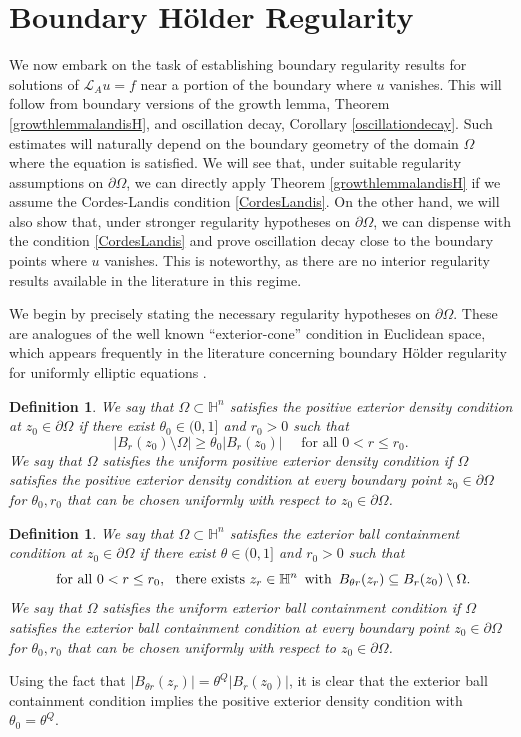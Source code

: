 \documentclass[12pt]{amsart}
\newtheorem{Definition}[Theorem]{Definition}
\newcommand{\Lop}{\mathcal{L}}
\def \H {{\mathbb H}}
\def \Hn {{\mathbb H}^n}
\def \O {\Omega}
\begin{document}
\section{Boundary H\"older Regularity}\label{sec:Holder}

We now embark on the task of establishing boundary regularity results for solutions of $\Lop_A u = f$ near a portion of the boundary where $u$ vanishes. This will follow from boundary versions of the growth lemma, Theorem \ref{growthlemmalandisH}, and oscillation decay, Corollary \ref{oscillationdecay}. Such estimates will naturally depend on the boundary geometry of the domain $\Omega$ where the equation is satisfied. We will see that, under suitable regularity assumptions on $\partial\Omega$, we can directly apply Theorem \ref{growthlemmalandisH} if we assume the Cordes-Landis condition \eqref{CordesLandis}. On the other hand, we will also show that, under stronger regularity hypotheses on $\partial\Omega$, we can dispense with the condition \eqref{CordesLandis} and prove oscillation decay close to the boundary points where $u$ vanishes. This is noteworthy, as there are no interior regularity results available in the literature in this regime.  

We begin by precisely stating the necessary regularity hypotheses on $\partial\Omega$. These are analogues of the well known ``exterior-cone'' condition in Euclidean space, which appears frequently in the literature concerning boundary H\"older regularity for uniformly elliptic equations \cite{Miller67, %
Michael81, ChoSafonov}.

\begin{Definition}
We say that $\O \subset \H^n$ satisfies the \emph{positive exterior density condition} at $z_0\in\partial\O$ if there exist $\theta_0 \in (0,1]$ and $r _0>0$ such that
$$
|B_r(z_0) \setminus \O|  \geq \theta_0 |B_r(z_0)|\quad\mbox{ for all }0<r\leq r_0.
$$
We say that $\O$ satisfies the \emph{uniform positive exterior density condition} if $\O$ satisfies the positive exterior density condition at every boundary point $z_0\in\partial\O$ for $\theta_0, r_0$ that can be chosen uniformly with respect to $z_0\in\partial\O$.
\end{Definition}

\begin{Definition}\label{contball}
We say that $\O \subset \H^n$ satisfies the \emph{exterior ball containment condition} at $z_0\in\partial\O$ if there exist $\theta\in (0,1]$ and $r_0>0$ such that
\begin{equation}\label{pointneeded}
\mbox{ for all } 0<r\leq r_0, \,\,\mbox{ there exists }z_r\in \Hn\mbox\, \mbox{ with }\, B_{\theta r}(z_r)\subseteq B_r(z_0) \setminus \O.
\end{equation}
We say that $\O$ satisfies the \emph{uniform exterior ball containment condition} if $\O$ satisfies the exterior ball containment condition at every boundary point $z_0\in\partial\O$ for $\theta_0, r_0$ that can be chosen uniformly with respect to $z_0\in\partial\O$.
\end{Definition}
Using the fact that $|B_{\theta r}(z_r)|=\theta^Q |B_r(z_0)|$, it is clear that the exterior ball containment condition implies the positive exterior density condition with $\theta_0=\theta^Q$.
\end{document}
